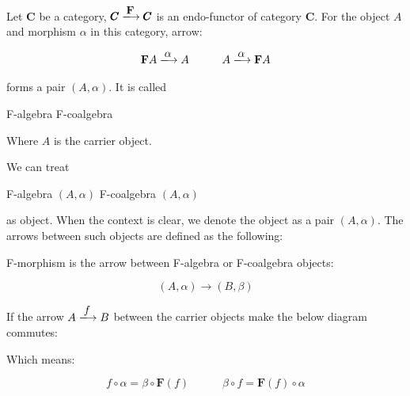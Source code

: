 \documentclass[b5paper]{article}
\begin{document}
\begin{definition}
\normalfont
Let $\pmb{C}$ be a category, $\pmb{C} \arrowto{\mathbf{F}} \pmb{C}$ is an endo-functor of category $\pmb{C}$. For the object $A$ and morphism $\alpha$ in this category, arrow:

\[
  \mathbf{F} A \arrowto{\alpha} A
  \quad \quad \quad
  A \arrowto{\alpha} \mathbf{F} A
\]

forms a pair $(A, \alpha)$. It is called

\begin{center}
  F-algebra \quad \quad \quad F-coalgebra
\end{center}

Where $A$ is the carrier object.
\end{definition}

We can treat

\begin{center}
  F-algebra $(A, \alpha)$ \quad \quad \quad F-coalgebra $(A, \alpha)$
\end{center}

as object. When the context is clear, we denote the object as a pair $(A, \alpha)$. The arrows between such objects are defined as the following:

\begin{definition}
\normalfont
F-morphism is the arrow between F-algebra or F-coalgebra objects:

\[
  (A, \alpha) \longrightarrow (B, \beta)
\]

If the arrow $A \arrowto{f} B$ between the carrier objects make the below diagram commutes:

\begin{center}
\end{center}

Which means:

\[
  f \circ \alpha = \beta \circ \mathbf{F}(f)
  \quad \quad \quad
  \beta \circ f = \mathbf{F}(f) \circ \alpha
\]
\end{definition}
\end{document}
